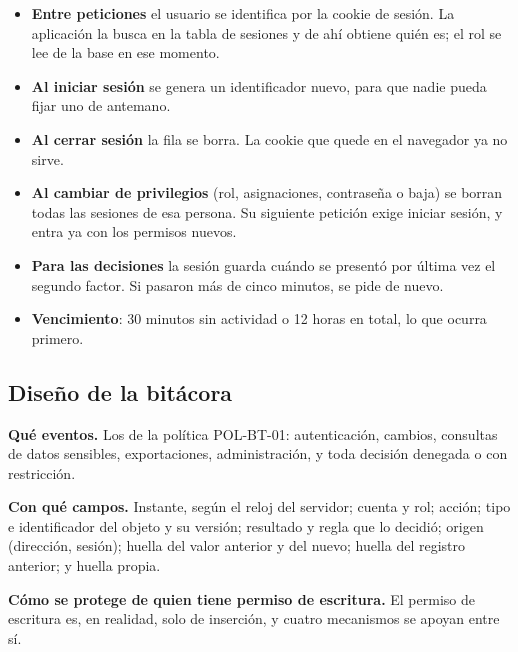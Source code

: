 \documentclass[11pt,letterpaper]{article}
\begin{document}
\begin{itemize}
\item \textbf{Entre peticiones} el usuario se identifica por la cookie de sesión. La aplicación la busca
      en la tabla de sesiones y de ahí obtiene quién es; el rol se lee de la base en ese momento.
\item \textbf{Al iniciar sesión} se genera un identificador nuevo, para que nadie pueda fijar uno de
      antemano.
\item \textbf{Al cerrar sesión} la fila se borra. La cookie que quede en el navegador ya no sirve.
\item \textbf{Al cambiar de privilegios} (rol, asignaciones, contraseña o baja) se borran todas las
      sesiones de esa persona. Su siguiente petición exige iniciar sesión, y entra ya con los permisos
      nuevos.
\item \textbf{Para las decisiones} la sesión guarda cuándo se presentó por última vez el segundo
      factor. Si pasaron más de cinco minutos, se pide de nuevo.
\item \textbf{Vencimiento}: 30 minutos sin actividad o 12 horas en total, lo que ocurra primero.
\end{itemize}

\subsection{Diseño de la bitácora}
\label{sec:bitacora}

\textbf{Qué eventos.} Los de la política POL-BT-01: autenticación, cambios, consultas de datos sensibles,
exportaciones, administración, y toda decisión denegada o con restricción.

\textbf{Con qué campos.} Instante, según el reloj del servidor; cuenta y rol; acción; tipo e identificador
del objeto y su versión; resultado y regla que lo decidió; origen (dirección, sesión); huella del valor
anterior y del nuevo; huella del registro anterior; y huella propia.

\textbf{Cómo se protege de quien tiene permiso de escritura.} El permiso de escritura es, en realidad,
solo de inserción, y cuatro mecanismos se apoyan entre sí.
\end{document}
